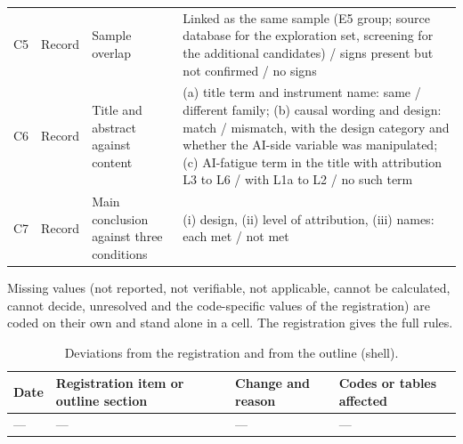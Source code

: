 \begin{table}[!htbp]
\begin{tabularx}{\linewidth}{lXXX}
C5 & Record & Sample overlap & Linked as the same sample (E5 group; source database for the exploration set, screening for the additional candidates) / signs present but not confirmed / no signs \\
C6 & Record & Title and abstract against content & (a) title term and instrument name: same / different family; (b) causal wording and design: match / mismatch, with the design category and whether the AI-side variable was manipulated; (c) AI-fatigue term in the title with attribution L3 to L6 / with L1a to L2 / no such term \\
C7 & Record & Main conclusion against three conditions & (i) design, (ii) level of attribution, (iii) names: each met / not met \\
\bottomrule
\end{tabularx}

\smallskip
\raggedright\footnotesize Missing values (not reported, not verifiable, not applicable, cannot be calculated, cannot
decide, unresolved and the code-specific values of the registration) are coded on their own and stand alone in a cell.
The registration gives the full rules.
\end{table}

\begin{table}[!htbp]
\centering
\caption{Deviations from the registration and from the outline (shell).}
\small
\begin{tabularx}{\linewidth}{lXXX}
\toprule
Date & Registration item or outline section & Change and reason & Codes or tables affected \\
\midrule
--- & --- & --- & --- \\
\bottomrule
\end{tabularx}
\end{table}

